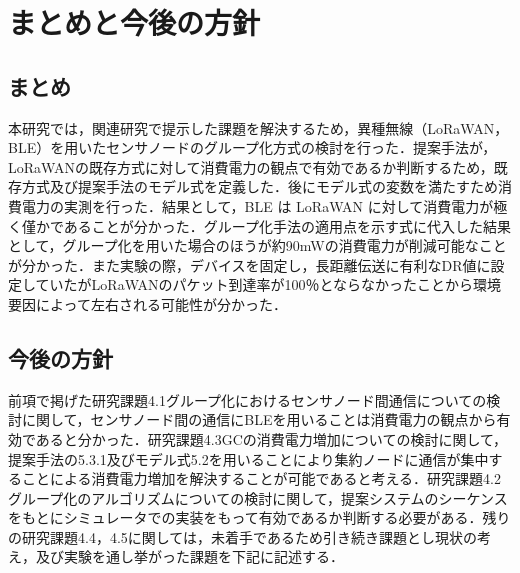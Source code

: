 \chapter{まとめと今後の方針}
\section{まとめ}
本研究では，関連研究で提示した課題を解決するため，異種無線（LoRaWAN，BLE）を用いたセンサノードのグループ化方式の検討を行った．提案手法が，LoRaWANの既存方式に対して消費電力の観点で有効であるか判断するため，既存方式及び提案手法のモデル式を定義した．後にモデル式の変数を満たすため消費電力の実測を行った．結果として，BLE は LoRaWAN に対して消費電力が極く僅かであることが分かった．グループ化手法の適用点を示す式に代入した結果として，グループ化を用いた場合のほうが約90mWの消費電力が削減可能なことが分かった．また実験の際，デバイスを固定し，長距離伝送に有利なDR値に設定していたがLoRaWANのパケット到達率が100％とならなかったことから環境要因によって左右される可能性が分かった．
\par

\section{今後の方針}
前項で掲げた研究課題4.1グループ化におけるセンサノード間通信についての検討に関して，センサノード間の通信にBLEを用いることは消費電力の観点から有効であると分かった．研究課題4.3GCの消費電力増加についての検討に関して，提案手法の5.3.1及びモデル式5.2を用いることにより集約ノードに通信が集中することによる消費電力増加を解決することが可能であると考える．研究課題4.2グループ化のアルゴリズムについての検討に関して，提案システムのシーケンスをもとにシミュレータでの実装をもって有効であるか判断する必要がある．残りの研究課題4.4，4.5に関しては，未着手であるため引き続き課題とし現状の考え，及び実験を通し挙がった課題を下記に記述する．

